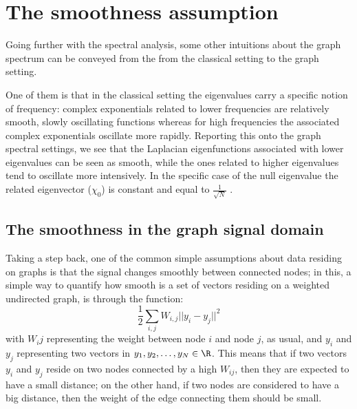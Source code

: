 \chapter{The smoothness assumption}
Going further with the spectral analysis, some other intuitions about the graph spectrum can be conveyed from the from the classical setting to the graph setting.

One of them is that in the classical setting the eigenvalues carry a specific notion of frequency: complex exponentials related to lower frequencies are relatively smooth, slowly oscillating functions whereas for high frequencies the associated complex exponentials oscillate more rapidly. Reporting this onto the graph spectral settings, we see that the Laplacian eigenfunctions associated with lower eigenvalues can be seen as smooth, while the ones related to higher eigenvalues tend to oscillate more intensively. \cite{Shuman2016} In the specific case of the null eigenvalue  the related eigenvector ($\chi_0$) is constant and equal to $\frac{1}{\sqrt{N}}$ \cite{Shuman2013}.
\section{The smoothness in the graph signal domain}
Taking a step back, one of the common simple assumptions about data residing on graphs is that the signal changes smoothly between connected nodes; in this, a simple way to quantify how smooth is a set of vectors residing on a weighted undirected graph, is through the function:
\begin{equation}
\frac{1}{2} \sum_{i,j}W_{i,j}||y_i - y_j||^2
\label{eq:smooth}
\end{equation}
with $W_ij$ representing the weight between node $i$ and node $j$, as usual, and $y_i$ and $y_j$ representing two vectors in $y_1, y_2, \dots, y_N \in \R$. This means that if two vectors $y_i$ and $y_j$ reside on two nodes connected by a high $W_{ij}$, then they are expected to have a small distance; on the other hand, if two nodes are considered to have a big distance, then the weight of the edge connecting them should be small.

